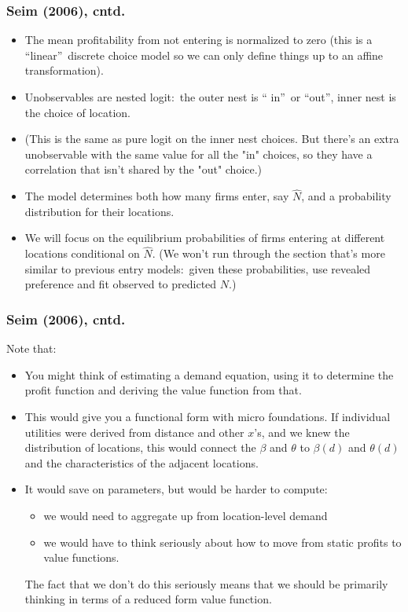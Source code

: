 \documentclass[aspectratio=169,11pt]{beamer}
\begin{document}
\begin{frame}
\frametitle{Seim (2006), cntd.}
\footnotesize
\begin{itemize}
\item The mean profitability from not entering is normalized to zero (this
is a \textquotedblleft linear\textquotedblright\ discrete choice model so we
can only define things up to an affine transformation).
\item Unobservables are nested logit:\ the outer nest is \textquotedblleft
in\textquotedblright\ or \textquotedblleft out\textquotedblright , inner
nest is the choice of location.
\item (This is the same as pure logit on the inner nest choices. But there's
an extra unobservable with the same value for all the "in" choices, so they
have a correlation that isn't shared by the "out" choice.)
\item The model determines both how many firms enter, say $\hat{N}$, and a
probability distribution for their locations.
\item We will focus on the equilibrium probabilities of firms entering at
different locations conditional on $\hat{N}$. (We won't run through the
section that's more similar to previous entry models:\ given these
probabilities, use revealed preference and fit observed to predicted $N$.)
\end{itemize}
\end{frame}

\begin{frame}
\frametitle{Seim (2006), cntd.}
\footnotesize
Note that:
\begin{itemize}
\item You might think of estimating a demand equation, using it to determine
the profit function and deriving the value function from that.
\item This would give you a functional form with micro foundations. If
individual utilities were derived from distance and other $x$'s, and we knew
the distribution of locations, this would connect the $\beta $ and $\theta $
to $\beta (d)$ and $\theta (d)$ and the characteristics of the adjacent
locations.
\item It would save on parameters, but would be harder to compute:
\begin{itemize}
\item we would need to aggregate up from location-level demand
\item we would have to think seriously about how to move from static profits
to value functions.
\end{itemize}
The fact that we don't do this seriously means that we should be primarily
thinking in terms of a reduced form value function.
\end{itemize}
\end{frame}
\end{document}
